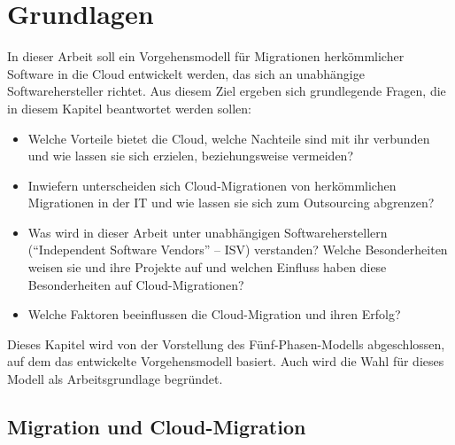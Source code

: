 \section{Grundlagen}
\label{cha:grundlagen}

In dieser Arbeit soll ein Vorgehensmodell für Migrationen herkömmlicher 
Software in die Cloud entwickelt werden, das sich an unabhängige 
Softwarehersteller richtet. Aus diesem Ziel ergeben sich grundlegende Fragen, 
die in diesem Kapitel beantwortet werden sollen:
\begin{itemize}
	\item Welche Vorteile bietet die Cloud, welche Nachteile sind mit ihr verbunden und wie lassen sie sich
erzielen, beziehungsweise vermeiden? 
	\item Inwiefern unterscheiden sich Cloud-Migrationen von herkömmlichen
Migrationen in der IT und wie lassen sie sich zum Outsourcing abgrenzen? 
	\item Was wird in dieser Arbeit unter unabhängigen 
Softwareherstellern ("`Independent Software Vendors"' -- ISV)  
verstanden? Welche Besonderheiten weisen sie und ihre Projekte auf und welchen
Einfluss haben diese Besonderheiten auf Cloud-Migrationen?
	\item Welche Faktoren beeinflussen die Cloud-Migration und ihren
Erfolg?
\end{itemize}
Dieses Kapitel wird von der Vorstellung des Fünf-Phasen-Modells abgeschlossen,
auf dem das entwickelte Vorgehensmodell basiert. Auch wird die Wahl für dieses
Modell als Arbeitsgrundlage begründet.

\subsection{Migration und Cloud-Migration}
\label{cha:definition_cloud-migration}

